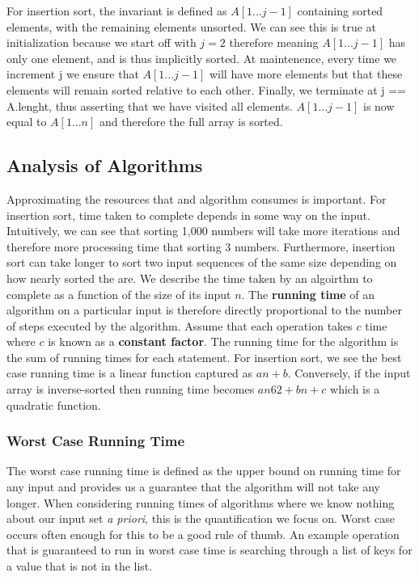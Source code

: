 \documentclass[10pt,a4paper]{article}
\begin{document}
\newline\newline
For insertion sort, the invariant is defined as $A[1...j-1]$ containing sorted elements, with the remaining elements unsorted. We can see this is true at initialization because we start off with $j=2$ therefore meaning $A[1...j-1]$ has only one element, and is thus implicitly sorted. At maintenence, every time we increment j we ensure that $A[1...j-1]$ will have more elements but that these elements will remain sorted relative to each other. Finally, we terminate at j == A.lenght, thus asserting that we have visited all elements. $A[1...j-1]$ is now equal to $A[1...n]$ and therefore the full array is sorted. 
\subsection{Analysis of Algorithms}
Approximating the resources that and algorithm consumes is important. For insertion sort, time taken to complete depends in some way on the input. Intuitively, we can see that sorting 1,000 numbers will take more iterations and therefore more processing time that sorting 3 numbers. Furthermore, insertion sort can take longer to sort two input sequences of the same size depending on how nearly sorted the are. We describe the time taken by an algoirthm to complete as a function of the size of its input $n$. The {\bf running time} of an algorithm on a particular input is therefore directly proportional to the number of steps executed by the algorithm. Assume that each operation takes $c$ time where $c$ is known as a {\bf constant factor}. The running time for the algorithm is the sum of running times for each statement. For insertion sort, we see the best case running time is a linear function captured as $an + b$. Conversely, if the input array is inverse-sorted then running time becomes $an62+bn+c$ which is a quadratic function. 
\subsubsection{Worst Case Running Time}
The worst case running time is defined as the upper bound on running time for any input and provides us a guarantee that the algorithm will not take any longer. When considering running times of algorithms where we know nothing about our input set {\it a priori}, this is the quantification we focus on. Worst case occurs often enough for this to be a good rule of thumb. An example operation that is guaranteed to run in worst case time is searching through a list of keys for a value that is not in the list. 
\end{document}
